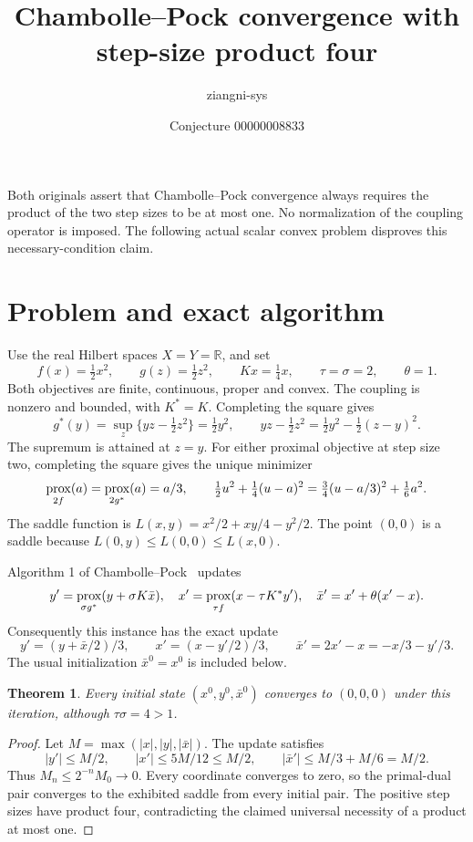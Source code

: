\documentclass[11pt]{article}
\title{Chambolle--Pock convergence with step-size product four}
\author{ziangni-sys}
\date{Conjecture 00000008833}
\newtheorem{theorem}{Theorem}
\begin{document}
\sloppy
\maketitle
\noindent Both originals assert that Chambolle--Pock convergence always
requires the product of the two step sizes to be at most one. No
normalization of the coupling operator is imposed. The following actual
scalar convex problem disproves this necessary-condition claim.

\section*{Problem and exact algorithm}
Use the real Hilbert spaces $X=Y=\mathbb R$, and set
\[
 f(x)=\tfrac12x^2,\qquad g(z)=\tfrac12z^2,\qquad Kx=\tfrac14x,
 \qquad \tau=\sigma=2,\qquad\theta=1.
\]
Both objectives are finite, continuous, proper and convex. The coupling is
nonzero and bounded, with $K^*=K$. Completing the square gives
\[
 g^*(y)=\sup_z\{yz-\tfrac12z^2\}=\tfrac12y^2,
 \qquad yz-\tfrac12z^2=\tfrac12y^2-\tfrac12(z-y)^2.
\]
The supremum is attained at $z=y$. For either proximal objective at step
size two, completing the square gives the unique minimizer
\[
 \mathop{\rm prox}_{2f}(a)=\mathop{\rm prox}_{2g^*}(a)=a/3,
 \qquad \tfrac12u^2+\tfrac14(u-a)^2
       =\tfrac34(u-a/3)^2+\tfrac16a^2.
\]
The saddle function is $L(x,y)=x^2/2+xy/4-y^2/2$.
The point $(0,0)$ is a saddle because $L(0,y)\le L(0,0)\le L(x,0)$.

Algorithm 1 of Chambolle--Pock~\cite{CP} updates
\[
 y'=\mathop{\rm prox}_{\sigma g^*}(y+\sigma K\bar x),\quad
 x'=\mathop{\rm prox}_{\tau f}(x-\tau K^*y'),\quad
 \bar x'=x'+\theta(x'-x).
\]
Consequently this instance has the exact update
\[
 y'=(y+\bar x/2)/3,\qquad x'=(x-y'/2)/3,
 \qquad \bar x'=2x'-x=-x/3-y'/3.
\]
The usual initialization $\bar x^0=x^0$ is included below.

\begin{theorem}
Every initial state $(x^0,y^0,\bar x^0)$ converges to $(0,0,0)$ under
this iteration, although $\tau\sigma=4>1$.
\end{theorem}
\begin{proof}
Let $M=\max(|x|,|y|,|\bar x|)$. The update satisfies
\[
 |y'|\le M/2,\qquad |x'|\le 5M/12\le M/2,
 \qquad |\bar x'|\le M/3+M/6=M/2.
\]
Thus $M_n\le 2^{-n}M_0\to0$. Every coordinate converges to zero,
so the primal-dual pair converges to the exhibited saddle from every
initial pair. The positive step sizes have product four, contradicting
the claimed universal necessity of a product at most one.
\end{proof}
\end{document}
